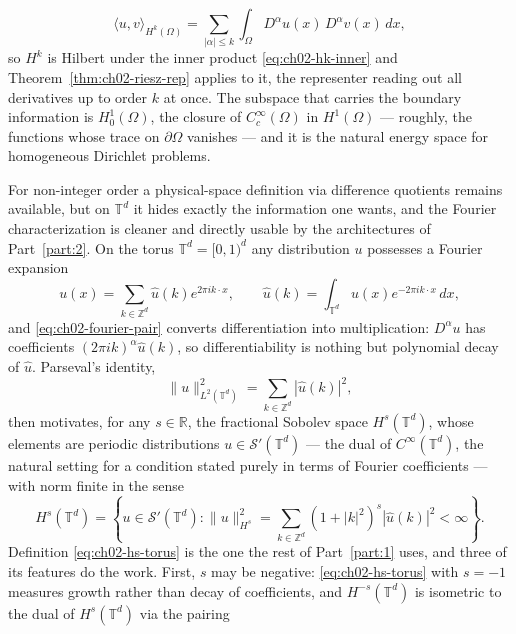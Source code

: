 \begin{equation}
  \langle u, v \rangle_{H^k(\Omega)} = \sum_{|\alpha| \le k} \int_\Omega D^\alpha u(x) \, D^\alpha v(x) \, dx,
  \label{eq:ch02-hk-inner}
\end{equation}
so $H^k$ is Hilbert under the inner product \eqref{eq:ch02-hk-inner} and Theorem~\ref{thm:ch02-riesz-rep} applies to it, the representer reading out all derivatives up to order $k$ at once. The subspace that carries the boundary information is $H^1_0(\Omega)$, the closure of $C_c^\infty(\Omega)$ in $H^1(\Omega)$ --- roughly, the functions whose trace on $\partial\Omega$ vanishes --- and it is the natural energy space for homogeneous Dirichlet problems.

For non-integer order a physical-space definition via difference quotients remains available, but on $\mathbb{T}^d$ it hides exactly the information one wants, and the Fourier characterization is cleaner and directly usable by the architectures of Part~\ref{part:2}. On the torus $\mathbb{T}^d = [0,1)^d$ any distribution $u$ possesses a Fourier expansion
\begin{equation}
  u(x) = \sum_{k \in \mathbb{Z}^d} \hat{u}(k) e^{2\pi i k \cdot x}, \qquad \hat{u}(k) = \int_{\mathbb{T}^d} u(x) e^{-2\pi i k \cdot x} \, dx,
  \label{eq:ch02-fourier-pair}
\end{equation}
and \eqref{eq:ch02-fourier-pair} converts differentiation into multiplication: $D^\alpha u$ has coefficients $(2\pi i k)^\alpha \hat{u}(k)$, so differentiability is nothing but polynomial decay of $\hat u$. Parseval's identity,
\begin{equation}
  \|u\|_{L^2(\mathbb{T}^d)}^2 = \sum_{k \in \mathbb{Z}^d} |\hat{u}(k)|^2,
  \label{eq:ch02-parseval}
\end{equation}
then motivates, for any $s \in \mathbb{R}$, the fractional Sobolev space $H^s(\mathbb{T}^d)$, whose elements are periodic distributions $u \in \mathcal{S}'(\mathbb{T}^d)$ --- the dual of $C^\infty(\mathbb{T}^d)$, the natural setting for a condition stated purely in terms of Fourier coefficients --- with norm finite in the sense
\begin{equation}
  H^s(\mathbb{T}^d) = \left\{ u \in \mathcal{S}'(\mathbb{T}^d) : \|u\|_{H^s}^2 = \sum_{k \in \mathbb{Z}^d} (1 + |k|^2)^s |\hat{u}(k)|^2 < \infty \right\}.
  \label{eq:ch02-hs-torus}
\end{equation}
Definition \eqref{eq:ch02-hs-torus} is the one the rest of Part~\ref{part:1} uses, and three of its features do the work. First, $s$ may be negative: \eqref{eq:ch02-hs-torus} with $s = -1$ measures growth rather than decay of coefficients, and $H^{-s}(\mathbb{T}^d)$ is isometric to the dual of $H^s(\mathbb{T}^d)$ via the pairing
